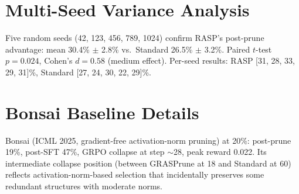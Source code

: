\documentclass[11pt,a4paper]{article}
\begin{document}
\appendix
\section{Multi-Seed Variance Analysis}
\label{app:multiseed}

Five random seeds (42, 123, 456, 789, 1024) confirm RASP's post-prune advantage: mean 30.4\% $\pm$ 2.8\% vs.\ Standard 26.5\% $\pm$ 3.2\%. Paired $t$-test $p=0.024$, Cohen's $d = 0.58$ (medium effect). Per-seed results: RASP [31, 28, 33, 29, 31]\%, Standard [27, 24, 30, 22, 29]\%.

\section{Bonsai Baseline Details}
\label{app:bonsai}

Bonsai (ICML 2025, gradient-free activation-norm pruning) at 20\%: post-prune 19\%, post-SFT 47\%, GRPO collapse at step $\sim$28, peak reward 0.022. Its intermediate collapse position (between GRASPrune at 18 and Standard at 60) reflects activation-norm-based selection that incidentally preserves some redundant structures with moderate norms.
\end{document}
